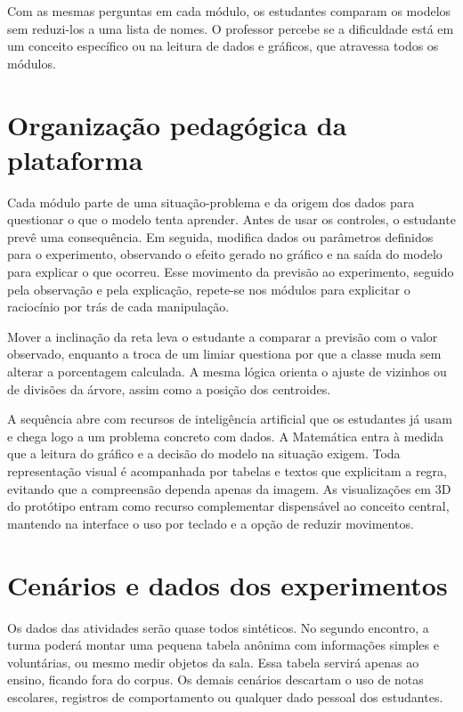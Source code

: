 Com as mesmas perguntas em cada módulo, os estudantes comparam os modelos sem reduzi-los a uma lista de nomes. O professor percebe se a dificuldade está em um conceito específico ou na leitura de dados e gráficos, que atravessa todos os módulos.

\section{Organização pedagógica da plataforma}

Cada módulo parte de uma situação-problema e da origem dos dados para questionar o que o modelo tenta aprender. Antes de usar os controles, o estudante prevê uma consequência. Em seguida, modifica dados ou parâmetros definidos para o experimento, observando o efeito gerado no gráfico e na saída do modelo para explicar o que ocorreu. Esse movimento da previsão ao experimento, seguido pela observação e pela explicação, repete-se nos módulos para explicitar o raciocínio por trás de cada manipulação.

Mover a inclinação da reta leva o estudante a comparar a previsão com o valor observado, enquanto a troca de um limiar questiona por que a classe muda sem alterar a porcentagem calculada. A mesma lógica orienta o ajuste de vizinhos ou de divisões da árvore, assim como a posição dos centroides.

A sequência abre com recursos de inteligência artificial que os estudantes já usam e chega logo a um problema concreto com dados. A Matemática entra à medida que a leitura do gráfico e a decisão do modelo na situação exigem. Toda representação visual é acompanhada por tabelas e textos que explicitam a regra, evitando que a compreensão dependa apenas da imagem. As visualizações em 3D do protótipo entram como recurso complementar dispensável ao conceito central, mantendo na interface o uso por teclado e a opção de reduzir movimentos.

\section{Cenários e dados dos experimentos}

Os dados das atividades serão quase todos sintéticos. No segundo encontro, a turma poderá montar uma pequena tabela anônima com informações simples e voluntárias, ou mesmo medir objetos da sala. Essa tabela servirá apenas ao ensino, ficando fora do corpus. Os demais cenários descartam o uso de notas escolares, registros de comportamento ou qualquer dado pessoal dos estudantes.

